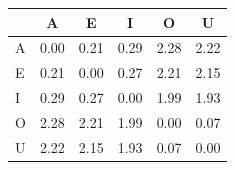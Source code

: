 \begin{tabular}{lccccc}
\toprule
\rowcolor{col01}
 & A & E & I & O & U \\
\midrule
A & 0.00 & 0.21 & 0.29 & 2.28 & 2.22 \\
E & 0.21 & 0.00 & 0.27 & 2.21 & 2.15 \\
I & 0.29 & 0.27 & 0.00 & 1.99 & 1.93 \\
O & 2.28 & 2.21 & 1.99 & 0.00 & 0.07 \\
U & 2.22 & 2.15 & 1.93 & 0.07 & 0.00 \\
\bottomrule
\end{tabular}
